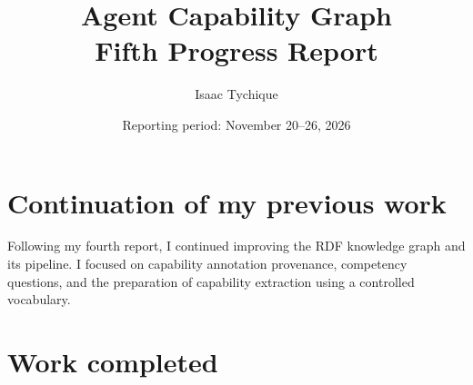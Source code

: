\documentclass[11pt,a4paper]{article}
\title{Agent Capability Graph\\\large Fifth Progress Report}
\author{Isaac Tychique}
\date{Reporting period: November 20--26, 2026}
\begin{document}
\maketitle

\section*{Continuation of my previous work}
Following my fourth report, I continued improving the RDF knowledge graph and its pipeline. I focused on capability annotation provenance, competency questions, and the preparation of capability extraction using a controlled vocabulary.

\section*{Work completed}
\end{document}
